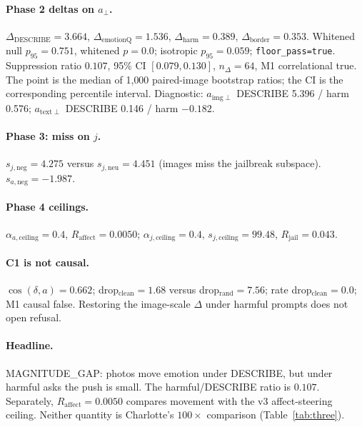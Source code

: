 \documentclass{article}
\begin{document}
\paragraph{Phase 2 deltas on $a_\perp$.}
$\Delta_{\mathrm{DESCRIBE}}=3.664$, $\Delta_{\mathrm{emotionQ}}=1.536$, $\Delta_{\mathrm{harm}}=0.389$, $\Delta_{\mathrm{border}}=0.353$. Whitened null $p_{95}=0.751$, whitened $p=0.0$; isotropic $p_{95}=0.059$; \texttt{floor\_pass=true}. Suppression ratio $0.107$, 95\% CI $[0.079,0.130]$, $n_\Delta=64$, M1 correlational true. The point is the median of 1{,}000 paired-image bootstrap ratios; the CI is the corresponding percentile interval. Diagnostic: $a_{\mathrm{img}\perp}$ DESCRIBE 5.396 / harm 0.576; $a_{\mathrm{text}\perp}$ DESCRIBE 0.146 / harm $-0.182$.

\paragraph{Phase 3: miss on $j$.}
$s_{j,\mathrm{neg}}=4.275$ versus $s_{j,\mathrm{neu}}=4.451$ (images miss the jailbreak subspace). $s_{a,\mathrm{neg}}=-1.987$.

\paragraph{Phase 4 ceilings.}
$\alpha_{a,\mathrm{ceiling}}=0.4$, $R_{\mathrm{affect}}=0.0050$; $\alpha_{j,\mathrm{ceiling}}=0.4$, $s_{j,\mathrm{ceiling}}=99.48$, $R_{\mathrm{jail}}=0.043$.

\paragraph{C1 is not causal.}
$\cos(\delta,a)=0.662$; drop$_{\mathrm{clean}}=1.68$ versus drop$_{\mathrm{rand}}=7.56$; rate drop$_{\mathrm{clean}}=0.0$; M1 causal false. Restoring the image-scale $\Delta$ under harmful prompts does not open refusal.

\paragraph{Headline.}
MAGNITUDE\_GAP: photos move emotion under DESCRIBE, but under harmful asks the push is small. The harmful/DESCRIBE ratio is $0.107$. Separately, $R_{\mathrm{affect}}=0.0050$ compares movement with the v3 affect-steering ceiling. Neither quantity is Charlotte's $100\times$ comparison (Table~\ref{tab:three}).
\end{document}
